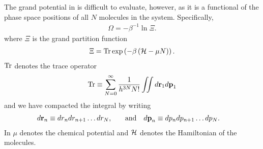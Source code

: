 {The grand potential in  is difficult to evaluate, however,
as it is a functional of the 
phase space positions of all $N$ molecules in the system.
Specifically,  
\begin{align}
  \Omega = -\beta^{-1}\ln \Xi.
\end{align}
where $\Xi$ is the grand partition function
\begin{align}
  \Xi = \textrm{Tr} \exp\left( -\beta \left( {\cal H} - \mu N \right) \right). \label{eqn:nuc:GPF}
\end{align}
 $\textrm{Tr}$ denotes the trace operator
\begin{align}
  \textrm{Tr} \equiv \sum_{N=0}^\infty \frac{1}{h^{3N}N!} \iint d{\mathbf{\textbf{r}}}_1 d{\mathbf{\textbf{p}}}_1
\end{align}
and we have compacted the integral by writing 
\begin{align}
d{\mathbf{\textbf{r}}}_n &\equiv dr_n dr_{n+1}\ldots dr_N, &&\quad\text{and}&
d{\mathbf{\textbf{p}}}_n &\equiv  dp_n dp_{n+1}\ldots dp_N.
\label{eqn:dshorthand}
\end{align}
In  $\mu$ denotes the chemical potential and ${\cal H}$ denotes the Hamiltonian of the molecules.

}
